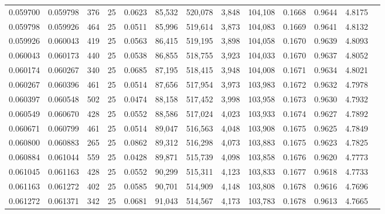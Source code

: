 \begin{tabular}{rrrrrrrrrrrrr}
0.059700 & 0.059798 &   376 &  25 &                                     0.0623 &  85,532 & 520,078 &   3,848 & 104,108 & 0.1668 & 0.9644 & 4.8175 \\
0.059798 & 0.059926 &   464 &  25 &                                     0.0511 &  85,996 & 519,614 &   3,873 & 104,083 & 0.1669 & 0.9641 & 4.8132 \\
0.059926 & 0.060043 &   419 &  25 &                                     0.0563 &  86,415 & 519,195 &   3,898 & 104,058 & 0.1670 & 0.9639 & 4.8093 \\
0.060043 & 0.060173 &   440 &  25 &                                     0.0538 &  86,855 & 518,755 &   3,923 & 104,033 & 0.1670 & 0.9637 & 4.8052 \\
0.060174 & 0.060267 &   340 &  25 &                                     0.0685 &  87,195 & 518,415 &   3,948 & 104,008 & 0.1671 & 0.9634 & 4.8021 \\
0.060267 & 0.060396 &   461 &  25 &                                     0.0514 &  87,656 & 517,954 &   3,973 & 103,983 & 0.1672 & 0.9632 & 4.7978 \\
0.060397 & 0.060548 &   502 &  25 &                                     0.0474 &  88,158 & 517,452 &   3,998 & 103,958 & 0.1673 & 0.9630 & 4.7932 \\
0.060549 & 0.060670 &   428 &  25 &                                     0.0552 &  88,586 & 517,024 &   4,023 & 103,933 & 0.1674 & 0.9627 & 4.7892 \\
0.060671 & 0.060799 &   461 &  25 &                                     0.0514 &  89,047 & 516,563 &   4,048 & 103,908 & 0.1675 & 0.9625 & 4.7849 \\
0.060800 & 0.060883 &   265 &  25 &                                     0.0862 &  89,312 & 516,298 &   4,073 & 103,883 & 0.1675 & 0.9623 & 4.7825 \\
0.060884 & 0.061044 &   559 &  25 &                                     0.0428 &  89,871 & 515,739 &   4,098 & 103,858 & 0.1676 & 0.9620 & 4.7773 \\
0.061045 & 0.061163 &   428 &  25 &                                     0.0552 &  90,299 & 515,311 &   4,123 & 103,833 & 0.1677 & 0.9618 & 4.7733 \\
0.061163 & 0.061272 &   402 &  25 &                                     0.0585 &  90,701 & 514,909 &   4,148 & 103,808 & 0.1678 & 0.9616 & 4.7696 \\
0.061272 & 0.061371 &   342 &  25 &                                     0.0681 &  91,043 & 514,567 &   4,173 & 103,783 & 0.1678 & 0.9613 & 4.7665 \\

\end{tabular}
